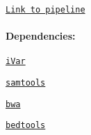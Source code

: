 \href{https://github.com/andersen-lab/ivar/tree/master/pipeline_field/}{\tt Link to pipeline}

\paragraph*{Dependencies\+:}


\begin{DoxyItemize}
\item \href{https://github.com/andersen-lab/ivar}{\tt i\+Var}
\item \href{https://htslib.org/}{\tt samtools}
\item \href{https://github.com/lh3/bwa}{\tt bwa}
\item \href{https://bedtools.readthedocs.io/en/latest/}{\tt bedtools} 
\end{DoxyItemize}